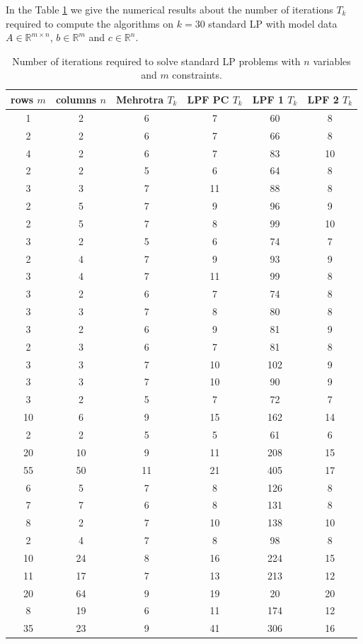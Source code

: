 \documentclass[a4paper,10 pt,titlepage,twoside]{book}
\theoremstyle{plain}
\theoremstyle{definition}
\theoremstyle{remark}
\begin{document}
In the Table \ref{tab:numite} we give the numerical results about the number of iterations $T_{k}$ required to compute the algorithms on $k =30$ standard LP with model data $A\in\mathbb{R}^{m\times n}$, $b\in\mathbb{R}^{m}$ and $c\in\mathbb{R}^{n}$.

\begin{table}[]\caption{\label{tab:numite}Number of iterations required to solve standard LP problems with $n$ variables and $m$ constraints.}
	\begin{center}
	\begin{tabular}{cccccc}
		\hline
		\textbf{rows $m$} & \textbf{columns $n$} & \textbf{Mehrotra $T_{k}$} & \textbf{LPF PC $T_{k}$} & \textbf{LPF 1 $T_{k}$} & \textbf{LPF 2 $T_{k}$} \\ \hline
		1 & 2 & 6 & 7 & 60 & 8 \\
		2 & 2 & 6 & 7 & 66 & 8 \\
		4 & 2 & 6 & 7 & 83 & 10 \\
		2 & 2 & 5 & 6 & 64 & 8 \\
		3 & 3 & 7 & 11 & 88 & 8 \\
		2 & 5 & 7 & 9 & 96 & 9 \\
		2 & 5 & 7 & 8 & 99 & 10 \\
		3 & 2 & 5 & 6 & 74 & 7 \\
		2 & 4 & 7 & 9 & 93 & 9 \\
		3 & 4 & 7 & 11 & 99 & 8 \\
		3 & 2 & 6 & 7 & 74 & 8 \\
		3 & 3 & 7 & 8 & 80 & 8 \\
		3 & 2 & 6 & 9 & 81 & 9 \\
		2 & 3 & 6 & 7 & 81 & 8 \\
		3 & 3 & 7 & 10 & 102 & 9 \\
		3 & 3 & 7 & 10 & 90 & 9 \\
		3 & 2 & 5 & 7 & 72 & 7 \\
		10 & 6 & 9 & 15 & 162 & 14 \\
		2 & 2 & 5 & 5 & 61 & 6 \\
		20 & 10 & 9 & 11 & 208 & 15 \\
		55 & 50 & 11 & 21 & 405 & 17 \\
		6 & 5 & 7 & 8 & 126 & 8 \\
		7 & 7 & 6 & 8 & 131 & 8 \\
		8 & 2 & 7 & 10 & 138 & 10 \\
		2 & 4 & 7 & 8 & 98 & 8 \\
		10 & 24 & 8 & 16 & 224 & 15 \\
		11 & 17 & 7 & 13 & 213 & 12 \\
		20 & 64 & 9 & 19 & 20 & 20 \\
		8 & 19 & 6 & 11 & 174 & 12 \\
		35 & 23 & 9 & 41 & 306 & 16 \\ \hline
	\end{tabular}
\end{center}
\end{table}
\end{document}
